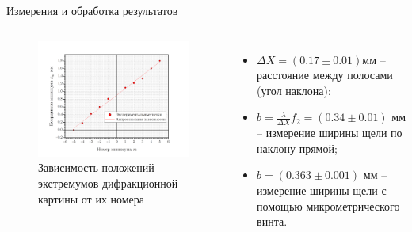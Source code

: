 \documentclass[11pt]{beamer} %
\begin{document}
    \begin{frame}{Измерения и обработка результатов}
       \begin{columns}
            \begin{figure}[H]
            \centering
                \includegraphics[width = \textwidth]{images/graph_b.png}
                \caption{Зависимость положений экстремумов дифракционной картины от их номера}
            \end{figure}

            \begin{itemize}
                \item $\Delta X = \left( 0.17 \pm 0.01 \right) \text{мм}$ -- расстояние между полосами (угол наклона);
                \item $b = \frac{\lambda}{\Delta X} f_2 = \left( 0.34 \pm 0.01 \right) \text{ мм}$ -- измерение ширины щели по наклону прямой;
                \item $b = \left( 0.363 \pm 0.001 \right)\text{ мм}$ -- измерение ширины щели с помощью микрометрического винта.
            \end{itemize}
        \end{columns}
    \end{frame}
\end{document}
